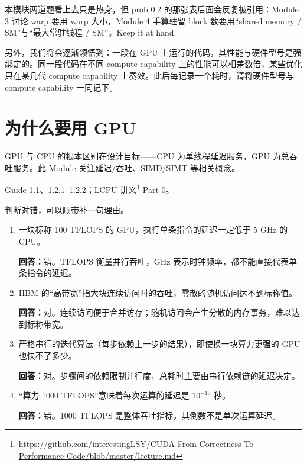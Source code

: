 \documentclass[11pt,a4paper,fontset=windows]{ctexart}
\begin{document}
\begin{lookback}
本模块两道题看上去只是热身，但 prob 0.2 的那张表后面会反复被引用：Module 3 讨论 warp 要用 warp 大小，Module 4 手算驻留 block 数要用“shared memory / SM”与“最大常驻线程 / SM”。Keep it at hand.

另外，我们将会逐渐领悟到：一段在 GPU 上运行的代码，其性能与硬件型号是强绑定的。同一段代码在不同 compute capability 上的性能可以相差数倍，某些优化只在某几代 compute capability 上奏效。此后每记录一个耗时，请将硬件型号与 compute capability 一同记下。
\end{lookback}

\section{为什么要用 GPU}

GPU 与 CPU 的根本区别在设计目标——CPU 为单线程延迟服务，GPU 为总吞吐服务。此 Module 关注延迟/吞吐、SIMD/SIMT 等相关概念。

\begin{reading}
Guide 1.1、1.2.1--1.2.2；LCPU 讲义\footnote{\url{https://github.com/interestingLSY/CUDA-From-Correctness-To-Performance-Code/blob/master/lecture.md}} Part 0。
\end{reading}

判断对错，可以顺带补一句理由。
\begin{enumerate}[label=(\alph*)]
  \item 一块标称 100 TFLOPS 的 GPU，执行单条指令的延迟一定低于 5 GHz 的 CPU。
  \par\textbf{回答：}错。TFLOPS 衡量并行吞吐，GHz 表示时钟频率，都不能直接代表单条指令的延迟。
  \item HBM 的“高带宽”指大块连续访问时的吞吐，零散的随机访问达不到标称值。
  \par\textbf{回答：}对。连续访问便于合并访存；随机访问会产生分散的内存事务，难以达到标称带宽。
  \item 严格串行的迭代算法（每步依赖上一步的结果），即使换一块算力更强的 GPU 也快不了多少。
  \par\textbf{回答：}对。步骤间的依赖限制并行度，总耗时主要由串行依赖链的延迟决定。
  \item “算力 1000 TFLOPS”意味着每次运算的延迟是 $10^{-15}$ 秒。
  \par\textbf{回答：}错。1000 TFLOPS 是整体吞吐指标，其倒数不是单次运算延迟。
\end{enumerate}
\end{document}
